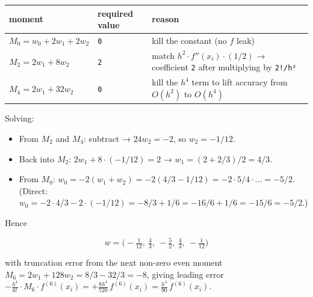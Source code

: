 {\def\LTcaptype{none} %
\begin{longtable}[]{@{}
  >{\raggedright\arraybackslash}p{}
  >{\raggedright\arraybackslash}p{}
  >{\raggedright\arraybackslash}p{}@{}}
\toprule\noalign{}
\begin{minipage}[b]{\linewidth}\raggedright
moment
\end{minipage} & \begin{minipage}[b]{\linewidth}\raggedright
required value
\end{minipage} & \begin{minipage}[b]{\linewidth}\raggedright
reason
\end{minipage} \\
\midrule\noalign{}
\endhead
\bottomrule\noalign{}
\endlastfoot
\(M_0 = w_0 + 2 w_1 + 2 w_2\) & \passthrough{\lstinline!0!} & kill the
constant (no \(f\) leak) \\
\(M_2 = 2 w_1 + 8 w_2\) & \passthrough{\lstinline!2!} & match
\(h^2 \cdot f''(x_i) \cdot (1/2)\) → coefficient
\passthrough{\lstinline!2!} after multiplying by
\passthrough{\lstinline"2!/h²"} \\
\(M_4 = 2 w_1 + 32 w_2\) & \passthrough{\lstinline!0!} & kill the
\(h^4\) term to lift accuracy from \(O(h^2)\) to \(O(h^4)\) \\
\end{longtable}
}

Solving:

\begin{itemize}
\tightlist
\item
  From \(M_2\) and \(M_4\): subtract → \(24 w_2 = -2\), so
  \(w_2 = -1/12\).
\item
  Back into \(M_2\): \(2 w_1 + 8 \cdot (-1/12) = 2\) →
  \(w_1 = (2 + 2/3)/2 = 4/3\).
\item
  From \(M_0\):
  \(w_0 = -2(w_1 + w_2) = -2(4/3 - 1/12) = -2 \cdot 5/4 \cdot ... = -5/2\).
  (Direct:
  \(w_0 = -2 \cdot 4/3 - 2 \cdot (-1/12) = -8/3 + 1/6 = -16/6 + 1/6 = -15/6 = -5/2\).)
\end{itemize}

Hence

\[
\boxed{\;w = \bigl(-\tfrac{1}{12},\ \tfrac{4}{3},\ -\tfrac{5}{2},\ \tfrac{4}{3},\ -\tfrac{1}{12}\bigr)\;}
\]

with truncation error from the next non-zero even moment
\(M_6 = 2 w_1 + 128 w_2 = 8/3 - 32/3 = -8\), giving leading error
\(-\tfrac{h^4}{6!}\cdot M_6 \cdot f^{(6)}(x_i) = +\tfrac{8 h^4}{720}\,f^{(6)}(x_i) = \tfrac{h^4}{90}\,f^{(6)}(x_i)\).

